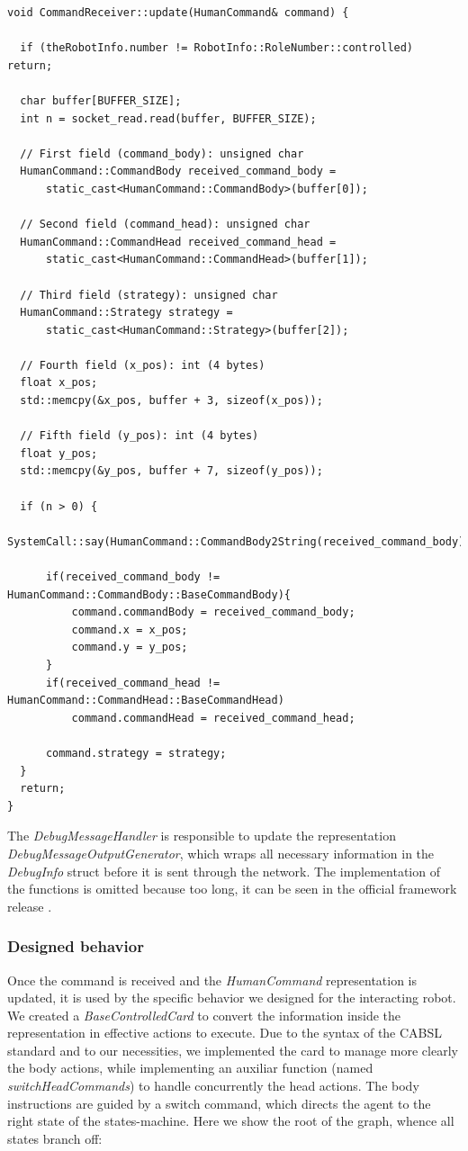 \documentclass[a4paper, onecolumn, 12pt]{article}
\begin{document}
\begin{verbatim}
void CommandReceiver::update(HumanCommand& command) {
  
  if (theRobotInfo.number != RobotInfo::RoleNumber::controlled) return;
  
  char buffer[BUFFER_SIZE];
  int n = socket_read.read(buffer, BUFFER_SIZE);
  
  // First field (command_body): unsigned char
  HumanCommand::CommandBody received_command_body = 
      static_cast<HumanCommand::CommandBody>(buffer[0]);
  
  // Second field (command_head): unsigned char
  HumanCommand::CommandHead received_command_head = 
      static_cast<HumanCommand::CommandHead>(buffer[1]);
  
  // Third field (strategy): unsigned char
  HumanCommand::Strategy strategy = 
      static_cast<HumanCommand::Strategy>(buffer[2]);
  
  // Fourth field (x_pos): int (4 bytes)
  float x_pos;
  std::memcpy(&x_pos, buffer + 3, sizeof(x_pos));
  
  // Fifth field (y_pos): int (4 bytes)
  float y_pos;
  std::memcpy(&y_pos, buffer + 7, sizeof(y_pos));
  
  if (n > 0) {
      SystemCall::say(HumanCommand::CommandBody2String(received_command_body));
  
      if(received_command_body != HumanCommand::CommandBody::BaseCommandBody){
          command.commandBody = received_command_body;
          command.x = x_pos;
          command.y = y_pos;
      }
      if(received_command_head != HumanCommand::CommandHead::BaseCommandHead)
          command.commandHead = received_command_head;
  
      command.strategy = strategy;
  }
  return;
}
\end{verbatim}

The \textit{DebugMessageHandler} is responsible to update the representation \textit{DebugMessageOutputGenerator},
which wraps all necessary information in the \textit{DebugInfo} struct before it is sent through
the network. The implementation 
of the functions is omitted because too long, it can be seen in the official framework release \cite{spqr}. 


\subsubsection{Designed behavior}
Once the command is received and the \textit{HumanCommand} representation is updated,
it is used by the specific behavior we designed for the interacting robot.
We created a \textit{BaseControlledCard} to convert the information inside the
representation in effective actions to execute. Due to the syntax of the CABSL standard
and to our necessities, we implemented the card to manage more clearly the body actions,
while implementing an auxiliar function (named \textit{switchHeadCommands}) to handle concurrently the head actions.
The body instructions are guided by a switch command, which directs the agent to the 
right state of the states-machine.
Here we show the root of the graph, whence all states branch off:
\end{document}

